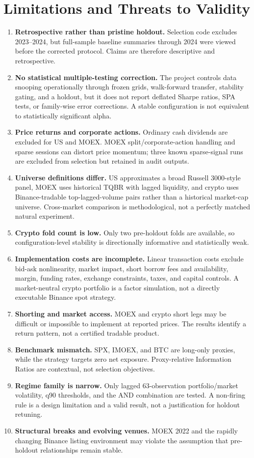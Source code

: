 \documentclass[11pt,a4paper]{article}
\begin{document}
\section{Limitations and Threats to Validity}

\begin{enumerate}
  \item \textbf{Retrospective rather than pristine holdout.} Selection code excludes 2023--2024, but full-sample baseline summaries through 2024 were viewed before the corrected protocol. Claims are therefore descriptive and retrospective.
  \item \textbf{No statistical multiple-testing correction.} The project controls data snooping operationally through frozen grids, walk-forward transfer, stability gating, and a holdout, but it does not report deflated Sharpe ratios, SPA tests, or family-wise error corrections. A stable configuration is not equivalent to statistically significant alpha.
  \item \textbf{Price returns and corporate actions.} Ordinary cash dividends are excluded for US and MOEX. MOEX split/corporate-action handling and sparse sessions can distort price momentum; three known sparse-signal runs are excluded from selection but retained in audit outputs.
  \item \textbf{Universe definitions differ.} US approximates a broad Russell 3000-style panel, MOEX uses historical TQBR with lagged liquidity, and crypto uses Binance-tradable top-lagged-volume pairs rather than a historical market-cap universe. Cross-market comparison is methodological, not a perfectly matched natural experiment.
  \item \textbf{Crypto fold count is low.} Only two pre-holdout folds are available, so configuration-level stability is directionally informative and statistically weak.
  \item \textbf{Implementation costs are incomplete.} Linear transaction costs exclude bid-ask nonlinearity, market impact, short borrow fees and availability, margin, funding rates, exchange constraints, taxes, and capital controls. A market-neutral crypto portfolio is a factor simulation, not a directly executable Binance spot strategy.
  \item \textbf{Shorting and market access.} MOEX and crypto short legs may be difficult or impossible to implement at reported prices. The results identify a return pattern, not a certified tradable product.
  \item \textbf{Benchmark mismatch.} SPX, IMOEX, and BTC are long-only proxies, while the strategy targets zero net exposure. Proxy-relative Information Ratios are contextual, not selection objectives.
  \item \textbf{Regime family is narrow.} Only lagged 63-observation portfolio/market volatility, q90 thresholds, and the AND combination are tested. A non-firing rule is a design limitation and a valid result, not a justification for holdout retuning.
  \item \textbf{Structural breaks and evolving venues.} MOEX 2022 and the rapidly changing Binance listing environment may violate the assumption that pre-holdout relationships remain stable.
\end{enumerate}
\end{document}
